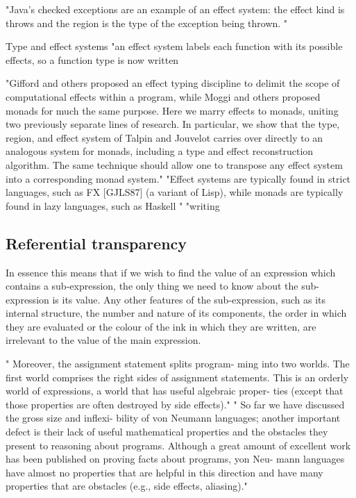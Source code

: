 "Java's checked exceptions are an example of an effect system: the effect kind is throws and the region is the type of the exception being thrown.
"

Type and effect systems
\cite{nielson1999type}
"an effect system labels each function with its possible effects, so a function type is now written %

"Gifford and others proposed an effect typing discipline to delimit the scope of computational effects within a program, while Moggi and others proposed monads for much the same purpose. Here we marry effects to monads, uniting two previously separate lines of research. In particular, we show that the type, region, and effect system of Talpin and Jouvelot carries over directly to an analogous system for monads, including a type and effect reconstruction algorithm. The same technique should allow one to transpose any effect system into a corresponding monad system."
"Effect systems are typically found in strict languages, such as FX [GJLS87] (a variant of Lisp), while monads are typically found in lazy languages, such as Haskell "
"writing %
\cite{wadler2003marriage}

\subsection{Referential transparency}

In essence this means that if we wish to find the value of an expression which contains a sub-expression, the only thing we need to know about the sub-expression is its value. Any other features of the sub-expression, such as its internal structure, the number and nature of its components, the order in which they are evaluated or the colour of the ink in which they are written, are irrelevant to the value of the main expression.
\cite{strachey2000fundamental}

"
Moreover, the assignment statement splits program- ming into two worlds. The first world comprises the right sides of assignment statements. This is an orderly world of expressions, a world that has useful algebraic proper- ties (except that those properties are often destroyed by side effects)."
"
So far we have discussed the gross size and inflexi- bility of von Neumann languages; another important defect is their lack of useful mathematical properties and the obstacles they present to reasoning about programs. Although a great amount of excellent work has been published on proving facts about programs, yon Neu- mann languages have almost no properties that are helpful in this direction and have many properties that are obstacles (e.g., side effects, aliasing)."
\cite{backus2007can}

